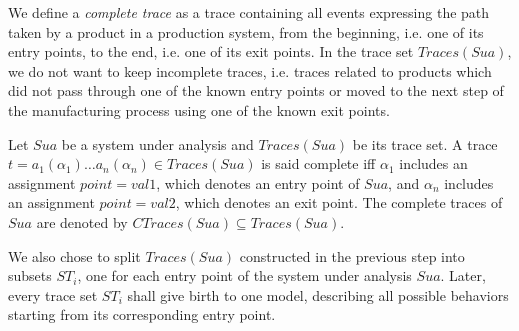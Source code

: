 We define a \textit{complete trace} as a trace containing all
events expressing the path taken by a product in a production
system, from the beginning, i.e. one of its entry points, to the
end, i.e. one of its exit points. In the trace set $Traces(Sua)$,
we do not want to keep incomplete traces, i.e.  traces related to
products which did not pass through one of the known entry points
or moved to the next step of the manufacturing process using one
of the known exit points.

\begin{definition}
Let $\mathit{Sua}$ be a system under analysis and $Traces({Sua})$
be its trace set. A trace $t=a_1(\alpha_1) \dots a_n(\alpha_n) \in
Traces({Sua})$ is said complete iff $\alpha_1$ includes an
assignment $point=val1$, which denotes an entry point of
$\mathit{Sua}$, and $\alpha_n$ includes an assignment
$point=val2$, which denotes an exit point.  The complete traces
of $\mathit{Sua}$ are denoted by $CTraces({Sua}) \subseteq
Traces({Sua})$.
\end{definition}

We also chose to split $Traces(Sua)$ constructed in the previous step
into subsets $ST_i$, one for each entry point of the system under
analysis $\mathit{Sua}$. Later, every trace set $ST_i$ shall give
birth to one model, describing all possible behaviors starting
from its corresponding entry point.

